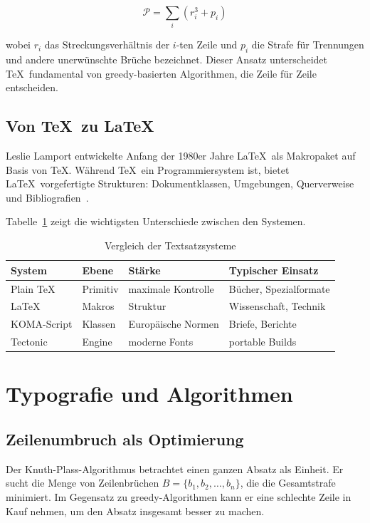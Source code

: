 \documentclass[
]{bfbook}
\begin{document}
\[
  \mathcal{P} = \sum_{i} \left( r_i^3 + p_i \right)
\]

wobei $r_i$ das Streckungsverhältnis der $i$-ten Zeile und $p_i$ die
Strafe für Trennungen und andere unerwünschte Brüche bezeichnet. Dieser
Ansatz unterscheidet \TeX\ fundamental von greedy-basierten Algorithmen,
die Zeile für Zeile entscheiden.

\section{Von \TeX\ zu \LaTeX}

Leslie Lamport entwickelte Anfang der 1980er Jahre \LaTeX\ als Makropaket
auf Basis von \TeX. Während \TeX\ ein Programmiersystem ist, bietet \LaTeX\
vorgefertigte Strukturen: Dokumentklassen, Umgebungen, Querverweise und
Bibliografien~\cite{mittelbach2004latex}.

Tabelle~\ref{tab:vergleich} zeigt die wichtigsten Unterschiede zwischen
den Systemen.

\begin{table}[h]
\centering
\caption{Vergleich der Textsatzsysteme}
\label{tab:vergleich}
\begin{tabular}{llll}
\toprule
System & Ebene & Stärke & Typischer Einsatz \\
\midrule
Plain \TeX   & Primitiv    & maximale Kontrolle  & Bücher, Spezialformate \\
\LaTeX       & Makros      & Struktur            & Wissenschaft, Technik \\
KOMA-Script  & Klassen     & Europäische Normen  & Briefe, Berichte \\
Tectonic     & Engine      & moderne Fonts       & portable Builds \\
\bottomrule
\end{tabular}
\end{table}

\chapter{Typografie und Algorithmen}

\section{Zeilenumbruch als Optimierung}

Der Knuth-Plass-Algorithmus betrachtet einen ganzen Absatz als Einheit.
Er sucht die Menge von Zeilenbrüchen $B = \{b_1, b_2, \ldots, b_n\}$,
die die Gesamtstrafe minimiert. Im Gegensatz zu greedy-Algorithmen kann
er eine schlechte Zeile in Kauf nehmen, um den Absatz insgesamt besser
zu machen.
\end{document}
